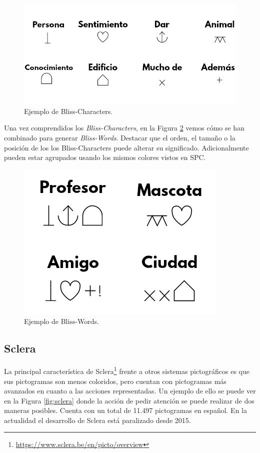 \begin{figure}[h!]
	\centering
	\includegraphics[width=0.8\linewidth]{Imagenes/Bitmap/BlissCharacters}
	\caption[Ejemplo de Bliss-Characters]{Ejemplo de Bliss-Characters.}
	\label{fig:blisscharacters}
\end{figure}
Una vez comprendidos los \textit{Bliss-Characters}, en la Figura \ref{fig:blissword} vemos cómo se han combinado para generar \textit{Bliss-Words}. Destacar que el orden, el tamaño o la posición de los los Bliss-Characters puede alterar su significado. Adicionalmente pueden estar agrupados usando los mismos colores vistos en SPC.

\begin{figure}[h!]
	\centering
	\includegraphics[width=0.4\linewidth]{Imagenes/Bitmap/BlissWord}
	\caption[Ejemplo de Bliss-Words]{Ejemplo de Bliss-Words.}
	\label{fig:blissword}
\end{figure}



\subsection{Sclera}
La principal característica de Sclera\footnote{\url{https://www.sclera.be/en/picto/overview}} frente a otros sistemas pictográficos es que sus pictogramas son menos coloridos, pero cuentan con pictogramas más avanzados en cuanto a las acciones representadas. Un ejemplo de ello se puede ver en la Figura \ref{fig:sclera} donde la acción de pedir atención se puede realizar de dos maneras posibles. Cuenta con un total de 11.497 pictogramas en español. En la actualidad el desarrollo de Sclera está paralizado desde 2015.




